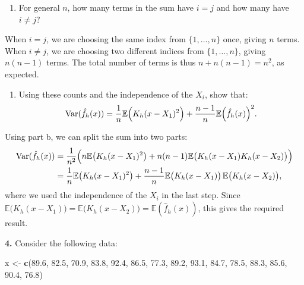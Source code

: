 \documentclass[
  a4paper,
]{article}
\newenvironment{Shaded}{\begin{snugshade}}{\end{snugshade}}
\newcommand{\FloatTok}[1]{\textcolor[rgb]{0.00,0.00,0.81}{#1}}
\newcommand{\FunctionTok}[1]{\textcolor[rgb]{0.13,0.29,0.53}{\textbf{#1}}}
\newcommand{\NormalTok}[1]{#1}
\newcommand{\OtherTok}[1]{\textcolor[rgb]{0.56,0.35,0.01}{#1}}
\providecommand{\tightlist}{%
  \setlength{\itemsep}{0pt}\setlength{\parskip}{0pt}}
\theoremstyle{definition}
\theoremstyle{definition}
\theoremstyle{definition}
\theoremstyle{definition}
\theoremstyle{remark}
\begin{document}
\begin{enumerate}
\def\labelenumi{\alph{enumi}.}
\setcounter{enumi}{1}
\tightlist
\item
  For general \(n\), how many terms in the sum have \(i=j\) and how many have~\(i\neq j\)?
\end{enumerate}

\begin{myanswers}
When \(i=j\), we are choosing the same index from \(\{1,\ldots,n\}\) once, giving \(n\) terms.
When \(i\neq j\), we are choosing two different indices from \(\{1,\ldots,n\}\), giving \(n(n-1)\) terms.
The total number of terms is thus \(n + n(n-1) = n^2\), as expected.

\end{myanswers}

\begin{enumerate}
\def\labelenumi{\alph{enumi}.}
\setcounter{enumi}{2}
\tightlist
\item
  Using these counts and the independence of the \(X_i\), show that:
  \begin{equation*}
    \mathop{\mathrm{Var}}(\hat f_h(x))
    = \frac{1}{n} \mathbb{E}\Bigl( K_h(x - X_1)^2 \Bigr)
   + \frac{n-1}{n} \mathbb{E}\Bigl( \hat f_h(x) \Bigr)^2.
  \end{equation*}
\end{enumerate}

\begin{myanswers}
Using part b, we can split the sum into two parts:
\begin{align*}
  \mathop{\mathrm{Var}}(\hat f_h(x))
  &= \frac{1}{n^2}
    \Bigl( n \mathbb{E}\bigl( K_h(x - X_1)^2 \bigr) + n(n-1) \mathbb{E}\bigl( K_h(x - X_1)K_h(x - X_2) \bigr) \Bigr) \\
  &= \frac{1}{n} \mathbb{E}\bigl( K_h(x - X_1)^2 \bigr)
    + \frac{n-1}{n} \mathbb{E}\bigl( K_h(x - X_1) \bigr) \, \mathbb{E}\bigl( K_h(x - X_2) \bigr),
\end{align*}
where we used the independence of the \(X_i\) in the last step.
Since \(\mathbb{E}\bigl( K_h(x - X_1) \bigr) = \mathbb{E}\bigl( K_h(x - X_2) \bigr) = \mathbb{E}(\hat
f_h(x))\), this gives the required result.

\end{myanswers}

\textbf{4.} Consider the following data:

\begin{Shaded}
\begin{Highlighting}[]
\NormalTok{x }\OtherTok{\textless{}{-}} \FunctionTok{c}\NormalTok{(}\FloatTok{89.6}\NormalTok{, }\FloatTok{82.5}\NormalTok{, }\FloatTok{70.9}\NormalTok{, }\FloatTok{83.8}\NormalTok{, }\FloatTok{92.4}\NormalTok{, }\FloatTok{86.5}\NormalTok{, }\FloatTok{77.3}\NormalTok{, }\FloatTok{89.2}\NormalTok{,}
       \FloatTok{93.1}\NormalTok{, }\FloatTok{84.7}\NormalTok{, }\FloatTok{78.5}\NormalTok{, }\FloatTok{88.3}\NormalTok{, }\FloatTok{85.6}\NormalTok{, }\FloatTok{90.4}\NormalTok{, }\FloatTok{76.8}\NormalTok{)}
\end{Highlighting}
\end{Shaded}
\end{document}
